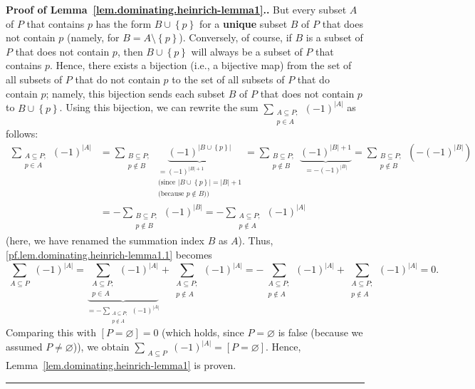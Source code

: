 \documentclass[numbers=enddot,12pt,final,onecolumn,notitlepage]{scrartcl}%
\theoremstyle{definition}
\newenvironment{proof}[1][Proof]{\noindent\textbf{#1.} }{\ \rule{0.5em}{0.5em}}
\let\sumnonlimits\sum
\renewcommand{\sum}{\sumnonlimits\limits}
\newcommand{\set}[1]{\left\{ #1 \right\}}
\newcommand{\abs}[1]{\left| #1 \right|}
\newcommand{\tup}[1]{\left( #1 \right)}
\newcommand{\ive}[1]{\left[ #1 \right]}
\begin{document}
\begin{proof}[Proof of Lemma~\ref{lem.dominating.heinrich-lemma1}.]
But every subset $A$ of $P$ that contains $p$ has the form
$B \cup \set{p}$ for a \textbf{unique} subset $B$ of $P$ that does
not contain $p$ (namely, for $B = A \setminus \set{p}$). Conversely,
of course, if $B$ is a subset of $P$ that does not contain $p$,
then $B \cup \set{p}$ will always be a subset of $P$ that contains
$p$. Hence, there exists a bijection (i.e., a bijective map)
from the set of all subsets of $P$ that do not contain $p$
  to the set of all subsets of $P$ that do contain $p$;
namely, this bijection sends each subset $B$ of $P$ that does not
contain $p$ to $B \cup \set{p}$. Using this bijection, we can rewrite
the sum
$\sum_{\substack{A \subseteq P; \\ p \in A}} \tup{-1}^{\abs{A}}$ as
follows:
\begin{align*}
\sum_{\substack{A \subseteq P; \\ p \in A}} \tup{-1}^{\abs{A}}
&= \sum_{\substack{B \subseteq P; \\ p \notin B}}
   \underbrace{\tup{-1}^{\abs{B \cup \set{p}}}}_{\substack{
     = \tup{-1}^{\abs{B}+1} \\
     \text{(since } \abs{B \cup \set{p}} = \abs{B} + 1 \\
     \text{(because } p \notin B \text{))}
   }}
= \sum_{\substack{B \subseteq P; \\ p \notin B}}
  \underbrace{\tup{-1}^{\abs{B}+1}}_{= - \tup{-1}^{\abs{B}}}
= \sum_{\substack{B \subseteq P; \\ p \notin B}}
  \tup{- \tup{-1}^{\abs{B}}} \\
&= - \sum_{\substack{B \subseteq P; \\ p \notin B}} \tup{-1}^{\abs{B}}
= - \sum_{\substack{A \subseteq P; \\ p \notin A}} \tup{-1}^{\abs{A}}
\end{align*}
(here, we have renamed the summation index $B$ as $A$).
Thus, \eqref{pf.lem.dominating.heinrich-lemma1.1} becomes
\[
\sum_{\substack{A \subseteq P}} \tup{-1}^{\abs{A}}
= \underbrace{\sum_{\substack{A \subseteq P; \\ p \in A}}
       \tup{-1}^{\abs{A}}}_{
     = - \sum_{\substack{A \subseteq P; \\ p \notin A}}
         \tup{-1}^{\abs{A}}}
  + \sum_{\substack{A \subseteq P; \\ p \notin A}} \tup{-1}^{\abs{A}}
= - \sum_{\substack{A \subseteq P; \\ p \notin A}} \tup{-1}^{\abs{A}}
  + \sum_{\substack{A \subseteq P; \\ p \notin A}} \tup{-1}^{\abs{A}}
= 0.
\]
Comparing this with $\ive{P = \varnothing} = 0$ (which holds, since
$P = \varnothing$ is false (because we assumed $P \neq \varnothing$)),
we obtain
$\sum_{\substack{A \subseteq P}} \tup{-1}^{\abs{A}}
= \ive{P = \varnothing}$. Hence,
Lemma~\ref{lem.dominating.heinrich-lemma1} is proven.
\end{proof}
\end{document}

